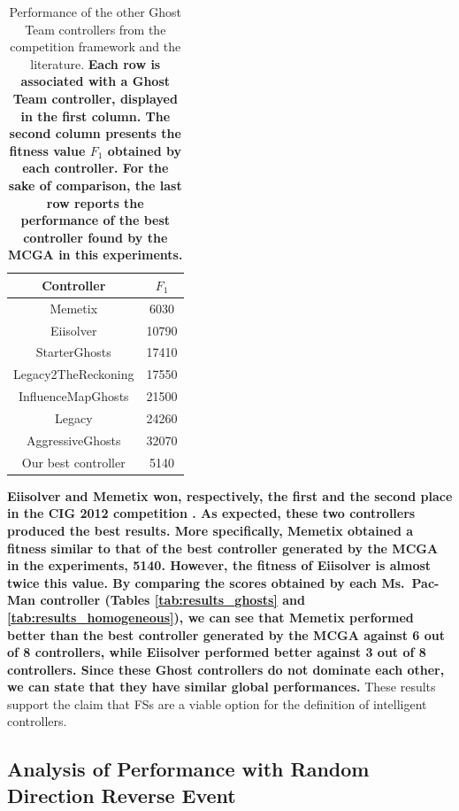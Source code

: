 \documentclass[journal]{IEEEtran}
\begin{document}
\begin{table} [!t]
\caption{Performance of the other Ghost Team controllers from the competition framework and the literature. \textbf{Each row is associated with a Ghost Team controller, displayed in the first column. The second column presents the fitness value $F_1$ obtained by each controller. For the sake of comparison, the last row reports the performance of the best controller found by the MCGA in this experiments.}}
\label{tab:summary_others}
\centering
\begin{tabular}{|c|c|}
\hline 
Controller & $F_1$ \\
\hline
Memetix\cite{Tose2012} & 6030 \\
\hline
Eiisolver \cite{Verhaard} & 10790 \\
\hline
StarterGhosts & 17410 \\
\hline
Legacy2TheReckoning & 17550 \\
\hline
InfluenceMapGhosts \cite{Svensson2012} & 21500 \\
\hline
Legacy & 24260 \\
\hline
AggressiveGhosts & 32070 \\
\hline
\hline
Our best controller & 5140 \\
\hline
\end{tabular}
\end{table}

\textbf{Eiisolver and Memetix won, respectively, the first and the second place in the CIG 2012 competition \cite{CompetitionURL}. As expected, these two controllers produced the best results. More specifically, Memetix obtained a fitness similar to that of the best controller generated by the MCGA in the experiments, 5140. However, the fitness of Eiisolver is almost twice this value. By comparing the scores obtained by each Ms.\ Pac-Man controller (Tables \ref{tab:results_ghosts} and \ref{tab:results_homogeneous}), we can see that Memetix performed better than the best controller generated by the MCGA against 6 out of 8 controllers, while Eiisolver performed better against 3 out of 8 controllers. Since these Ghost controllers do not dominate each other, we can state that they have similar global performances.} These results support the claim that FSs are a viable option for the definition of intelligent controllers.

\subsection{\textbf{Analysis of Performance with Random Direction Reverse Event}}
\end{document}
